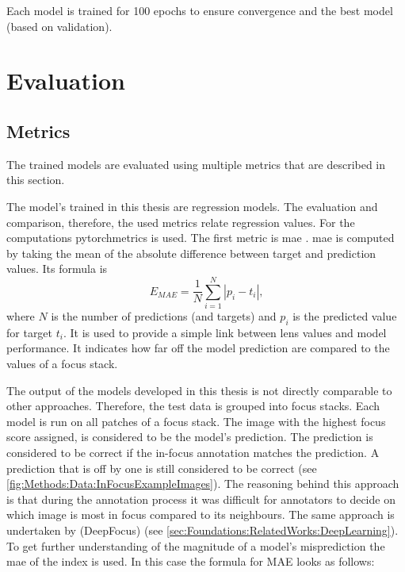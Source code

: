 Each model is trained for 100 epochs to ensure convergence and the best model (based on validation).

\section{Evaluation}
\label{sec:Methods:Evaluation}

\subsection{Metrics}
\label{sec:Methods:Evaluation:Metrics}

The trained models are evaluated using multiple metrics that are described in this section.

The model's trained in this thesis are regression models. The evaluation and comparison, therefore, the used metrics relate regression values. For the computations pytorchmetrics  is used. The first metric is \ac{mae} . \Ac{mae} is computed by taking the mean of the absolute difference between target and prediction values. Its formula is $$E_{MAE} = \frac{1}{N}\sum_{i=1}^N |p_i - t_i| \text{,}$$ where $N$ is the number of predictions (and targets) and $p_i$ is the predicted value for target $t_i$.
It is used to provide a simple link between lens values and model performance. It indicates how far off the model prediction are compared to the values of a focus stack.





The output of the models developed in this thesis is not directly comparable to other approaches. Therefore, the test data is grouped into focus stacks. Each model is run on all patches of a focus stack. The image with the highest focus score assigned, is considered to be the model's prediction. The prediction is considered to be correct if the in-focus annotation matches the prediction. A prediction that is off by one is still considered to be correct (see \autoref{fig:Methods:Data:InFocusExampleImages}).
The reasoning behind this approach is that during the annotation process it was difficult for annotators to decide on which image is most in focus compared to its neighbours. The same approach is undertaken by \citeauthor{senaras2018deepfocus} (DeepFocus) \cite{senaras2018deepfocus} (see \autoref{sec:Foundations:RelatedWorks:DeepLearning}). To get further understanding of the magnitude of a model's misprediction the \ac{mae} of the index is used. In this case the formula for MAE looks as follows:

